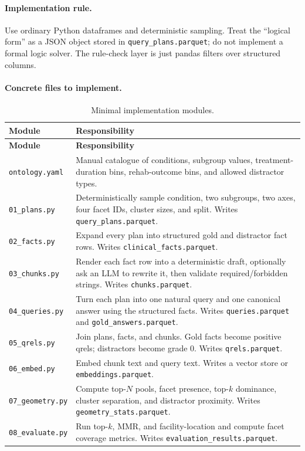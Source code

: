 \documentclass[11pt,a4paper]{article}
\newcommand{\field}[1]{\texttt{#1}}
\begin{document}
\paragraph{Implementation rule.}
Use ordinary Python dataframes and deterministic sampling. Treat the ``logical form'' as a JSON object stored in \field{query\_plans.parquet}; do not implement a formal logic solver. The rule-check layer is just pandas filters over structured columns.

\paragraph{Concrete files to implement.}

\begin{longtable}{p{3.7cm}p{10.9cm}}
	\caption{Minimal implementation modules.}\\
	\toprule
	\textbf{Module} & \textbf{Responsibility}\\
	\midrule
	\endfirsthead
	\toprule
	\textbf{Module} & \textbf{Responsibility}\\
	\midrule
	\endhead
	\bottomrule
	\endfoot
	\field{ontology.yaml} & Manual catalogue of conditions, subgroup values, treatment-duration bins, rehab-outcome bins, and allowed distractor types.\\
	\field{01\_plans.py} & Deterministically sample condition, two subgroups, two axes, four facet IDs, cluster sizes, and split. Writes \field{query\_plans.parquet}.\\
	\field{02\_facts.py} & Expand every plan into structured gold and distractor fact rows. Writes \field{clinical\_facts.parquet}.\\
	\field{03\_chunks.py} & Render each fact row into a deterministic draft, optionally ask an LLM to rewrite it, then validate required/forbidden strings. Writes \field{chunks.parquet}.\\
	\field{04\_queries.py} & Turn each plan into one natural query and one canonical answer using the structured facts. Writes \field{queries.parquet} and \field{gold\_answers.parquet}.\\
	\field{05\_qrels.py} & Join plans, facts, and chunks. Gold facts become positive qrels; distractors become grade 0. Writes \field{qrels.parquet}.\\
	\field{06\_embed.py} & Embed chunk text and query text. Writes a vector store or \field{embeddings.parquet}.\\
	\field{07\_geometry.py} & Compute top-$N$ pools, facet presence, top-$k$ dominance, cluster separation, and distractor proximity. Writes \field{geometry\_stats.parquet}.\\
	\field{08\_evaluate.py} & Run top-$k$, MMR, and facility-location and compute facet coverage metrics. Writes \field{evaluation\_results.parquet}.\\
\end{longtable}
\end{document}

